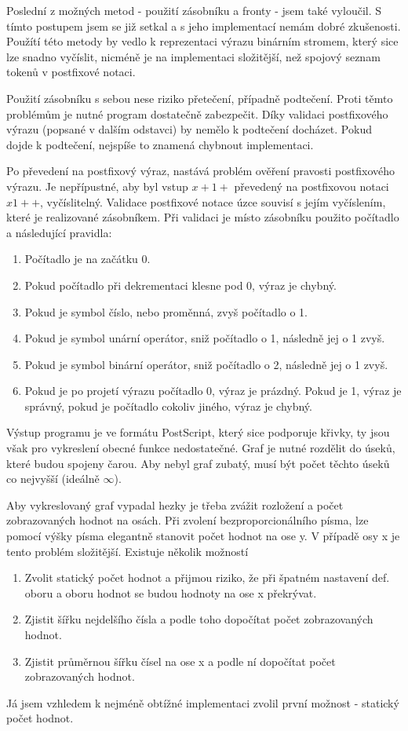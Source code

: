 \documentclass 	[a4paper,12pt]	{article}
\begin{document}
Poslední z možných metod - použití zásobníku a fronty - jsem také vyloučil. S tímto postupem jsem se již setkal a s jeho implementací nemám dobré zkušenosti. Použítí této metody by vedlo k reprezentaci výrazu binárním stromem, který sice lze snadno vyčíslit, nicméně je na implementaci složitější, než spojový seznam tokenů v postfixové notaci.  

Použití zásobníku s sebou nese riziko přetečení, případně podtečení. Proti těmto problémům je nutné program dostatečně zabezpečit. Díky validaci postfixového výrazu (popsané v dalším odstavci) by nemělo k podtečení docházet. Pokud dojde k podtečení, nejspíše to znamená chybnout implementaci.

Po převedení na postfixový výraz, nastává problém ověření pravosti postfixového výrazu. Je nepřípustné, aby byl vstup $x+1+$ převedený na postfixovou notaci $x1++$, vyčíslitelný. Validace postfixové notace úzce souvisí s jejím vyčíslením, které je realizované zásobníkem. Při validaci je místo zásobníku použito počítadlo a následující pravidla:
\begin{enumerate}
\item Počítadlo je na začátku 0.
\item Pokud počítadlo při dekrementaci klesne pod 0, výraz je chybný.
\item Pokud je symbol číslo, nebo proměnná, zvyš počítadlo o 1.
\item Pokud je symbol unární operátor, sniž počítadlo o 1, následně jej o 1 zvyš.
\item Pokud je symbol binární operátor, sniž počítadlo o 2, následně jej o 1 zvyš.
\item Pokud je po projetí výrazu počítadlo 0, výraz je prázdný. Pokud je 1, výraz je správný, pokud je počítadlo cokoliv jiného, výraz je chybný.
\end{enumerate}  

Výstup programu je ve formátu PostScript, který sice podporuje křivky, ty jsou však pro vykreslení obecné funkce nedostatečné. Graf je nutné rozdělit do úseků, které budou spojeny čarou. Aby nebyl graf zubatý, musí být počet těchto úseků co nejvyšší (ideálně $\infty$). 

Aby vykreslovaný graf vypadal hezky je třeba zvážit rozložení a počet zobrazovaných hodnot na osách. Při zvolení bezproporcionálního písma, lze pomocí výšky písma elegantně stanovit počet hodnot na ose y. V případě osy x je tento problém složitější. Existuje několik možností
\begin{enumerate}
\item Zvolit statický počet hodnot a přijmou riziko, že při špatném nastavení def. oboru a oboru hodnot se budou hodnoty na ose x překrývat.
\item Zjistit šířku nejdelšího čísla a podle toho dopočítat počet zobrazovaných hodnot.
\item Zjistit průměrnou šířku čísel na ose x a podle ní dopočítat počet zobrazovaných hodnot.
\end{enumerate}
Já jsem vzhledem k nejméně obtížné implementaci zvolil první možnost - statický počet hodnot.
\end{document}
